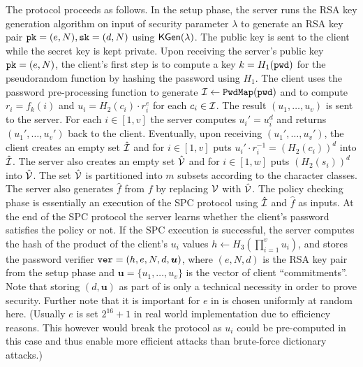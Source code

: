 The protocol proceeds as follows. 
In the setup phase, the server runs the RSA key generation algorithm on input of security parameter $\lambda$ to generate an RSA key pair $\mathtt{pk}=(e,N), \mathtt{sk}=(d,N)$ using $\mathsf{KGen}(\lambda)$. 
The public key is sent to the client while the secret key is kept private. 
Upon receiving the server's public key $\mathtt{pk}=(e,N)$, the client's first step is to compute a key $k=H_1(\mathtt{pwd})$ for the pseudorandom function by hashing the password using $H_1$. The client uses the password pre-processing function \PwdMap to generate $\mathcal{I}\gets\mathtt{PwdMap}(\mathtt{pwd})$ and to compute $r_i=f_k(i)$ and $u_i=H_2(c_i)\cdot r_i^e$ for each $c_i\in\mathcal{I}$.
The result $(u_1,\ldots,u_v)$ is sent to the server.
For each $i\in[1,v]$ the server computes $u_i'=u_i^d$ and returns $(u_1',\ldots,u_v')$ back to the client. 
Eventually, upon receiving $(u_1',\ldots,u_v')$, the client creates an empty set $\hat{\mathcal{I}}$ and for $i\in[1,v]$ puts $u_i'\cdot r_i^{-1}=(H_2(c_i))^d$ into $\hat{\mathcal{I}}$. 
The server also creates an empty set $\hat{\mathcal{V}}$ and for $i\in[1,w]$ puts $(H_2(s_i))^d$ into $\hat{\mathcal{V}}$. The set $\hat{\mathcal{V}}$ is partitioned into $m$ subsets according to the character classes. 
The server also generates $\hat{f}$ from $f$ by replacing $\mathcal{V}$ with $\hat{\mathcal{V}}$.
The policy checking phase is essentially an execution of  the \ac{SPC} protocol using $\hat{\mathcal{I}}$ and $\hat{f}$ as inputs. 
At the end of the \ac{SPC} protocol the server learns whether the client's password satisfies the policy or not. 
If the \ac{SPC} execution is successful, the server computes the hash of the product of the client's $u_i$ values $h\gets H_3(\prod_{i=1}^v u_i)$, and stores the password verifier $\mathtt{ver} = (h,e,N,d,\bm{u})$, where $(e,N,d)$ is the RSA key pair from the setup phase and $\bm{u}=\{u_1,\dots,u_v\}$ is the vector of client ``commitments''.
Note that storing $(d, \bm{u})$ as part of \ver is only a technical necessity in order to prove security.
Further note that it is important for $e$ in \KGen is chosen uniformly at random here.
(Usually $e$ is set $2^{16}+1$ in real world implementation due to efficiency reasons.
This however would break the protocol as $u_i$ could be pre-computed in this case and thus enable more efficient attacks than brute-force dictionary attacks.)

